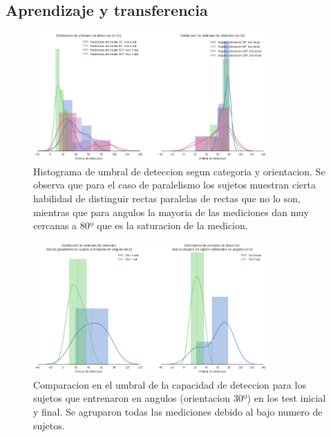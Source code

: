 \documentclass{article}
\begin{document}
\subsection{Aprendizaje y transferencia}

\begin{figure}
    \centering
    \includegraphics[width=0.8\textwidth]{Imagenes/TransferenciaTestInicialHistogramasTotales.png}
    \caption{Histograma de umbral de deteccion segun categoria y orientacion. Se observa que para el caso de paralelismo los sujetos muestran cierta habilidad de distinguir rectas paralelas de rectas que no lo son, mientras que para angulos la mayoria de las mediciones dan muy cercanas a 80º que es la saturacion de la medicion.}
    \label{fig:histogramasTestInicial}
\end{figure}

\begin{figure}
    \centering
    \includegraphics[width=0.8\textwidth]{Imagenes/TransferenciaHistogramasAngulosAntesVsDespues.png}
    \caption{Comparacion en el umbral de la capacidad de deteccion para los sujetos que entrenaron en angulos (orientacion 30º) en los test inicial y final. Se agruparon todas las mediciones debido al bajo numero de sujetos.}
    \label{fig:histogramasAntesVsDespuesAngulos}
\end{figure}
\end{document}
